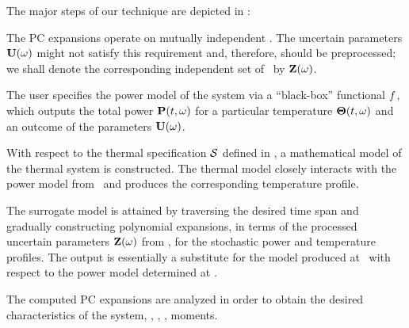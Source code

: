 The major steps of our technique are depicted in :

 The PC expansions operate on mutually independent \rvs. The uncertain parameters $\mathbf{U}(\omega)$ might not satisfy this requirement and, therefore, should be preprocessed; we shall denote the corresponding independent set of \rvs\ by $\mathbf{Z}(\omega)$.

 The user specifies the power model of the system via a ``black-box'' functional $f$, which outputs the total power $\mathbf{P}(t, \omega)$ for a particular temperature ${\boldsymbol\Theta}(t, \omega)$ and an outcome of the parameters $\mathbf{U}(\omega)$.

 With respect to the thermal specification $\mathcal{S}$ defined in , a mathematical model of the thermal system is constructed. The thermal model closely interacts with the power model from \ and produces the corresponding temperature profile.

 The surrogate model is attained by traversing the desired time span and gradually constructing polynomial expansions, in terms of the processed uncertain parameters $\mathbf{Z}(\omega)$ from , for the stochastic power and temperature profiles. The output is essentially a substitute for the model produced at \ with respect to the power model determined at .

 The computed PC expansions are analyzed in order to obtain the desired characteristics of the system, \eg, \cdfs, \pdfs, moments.
